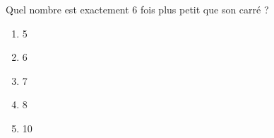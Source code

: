Quel nombre est exactement 6 fois plus petit que son carré ?
\begin{multicols}{5}
  \begin{enumerate}[A/]
  \item 5
  \item 6
  \item 7
  \item 8
  \item 10
  \end{enumerate}
\end{multicols}